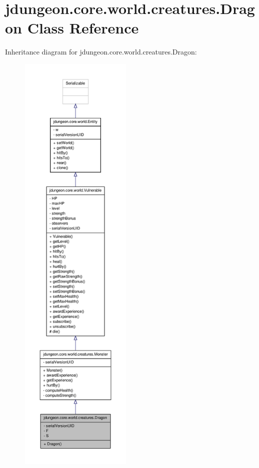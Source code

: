 \hypertarget{classjdungeon_1_1core_1_1world_1_1creatures_1_1_dragon}{
\section{jdungeon.core.world.creatures.Dragon Class Reference}
\label{classjdungeon_1_1core_1_1world_1_1creatures_1_1_dragon}
}


Inheritance diagram for jdungeon.core.world.creatures.Dragon:
\nopagebreak
\begin{figure}[H]
\begin{center}
\leavevmode
\includegraphics[height=600pt]{classjdungeon_1_1core_1_1world_1_1creatures_1_1_dragon__inherit__graph}
\end{center}
\end{figure}


